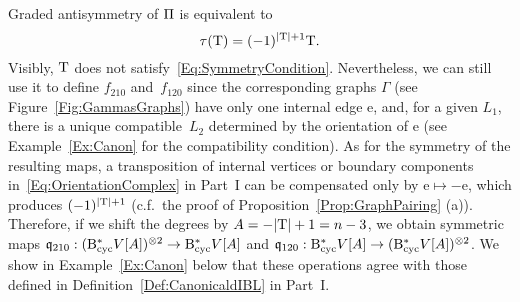 \documentclass[\MainFolder/Text.tex]{subfiles}
\begin{document}
Graded antisymmetry of $\Pi$ is equivalent to 
$$ \tau(\mathrm{T})= (-1)^{|\mathrm{T}|+1}\mathrm{T}. $$
Visibly, $\mathrm{T}$ does not satisfy~\eqref{Eq:SymmetryCondition}. Nevertheless, we can still use it to define $f_{210}$ and~$f_{120}$ since the corresponding graphs $\Gamma$ (see Figure~\ref{Fig:GammasGraphs}) have only one internal edge $\mathrm{e}$, and, for a given $L_1$, there is a unique compatible~$L_2$ determined by the orientation of $\mathrm{e}$ (see Example~\ref{Ex:Canon} for the compatibility condition). As for the symmetry of the resulting maps, a transposition of internal vertices or boundary components in~\eqref{Eq:OrientationComplex} in Part~I can be compensated only by $\mathrm{e}\mapsto-\mathrm{e}$, which produces $(-1)^{|\mathrm{T}|+1}$ (c.f.~the proof of Proposition~\ref{Prop:GraphPairing} (a)). Therefore, if we shift the degrees by $A= - |\mathrm{T}| +  1 = n- 3$, we obtain symmetric maps $\mathfrak{q}_{210}: (\mathrm{B}_{\mathrm{cyc}}^* V[A])^{\otimes 2} \rightarrow \mathrm{B}_{\mathrm{cyc}}^* V[A]$ and $\mathfrak{q}_{120}: \mathrm{B}_{\mathrm{cyc}}^* V[A] \rightarrow (\mathrm{B}_{\mathrm{cyc}}^* V[A])^{\otimes 2}$. We show in Example~\ref{Ex:Canon} below that these operations agree with those defined in Definition~\ref{Def:CanonicaldIBL} in Part~I.
\end{document}
